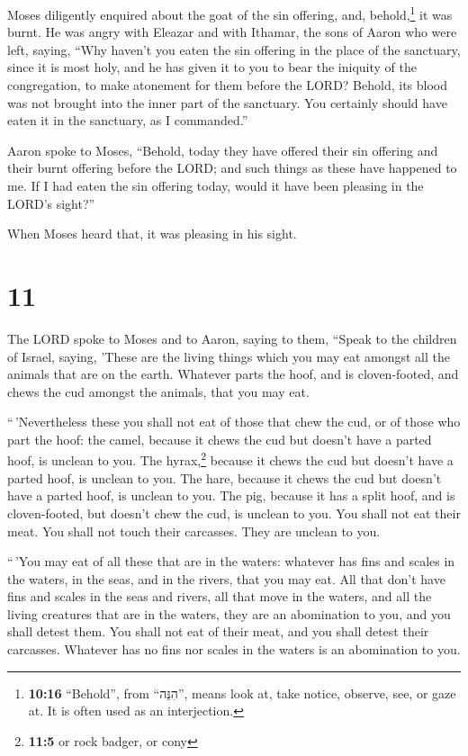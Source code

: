  Moses diligently enquired about the goat of the sin
offering, and, behold,\footnote{\textbf{10:16} ``Behold'', from
  ``הִנֵּה'', means look at, take notice, observe, see, or gaze at. It
  is often used as an interjection.} it was burnt. He was angry with
Eleazar and with Ithamar, the sons of Aaron who were left, saying,
 ``Why haven't you eaten the sin offering in the place of
the sanctuary, since it is most holy, and he has given it to you to bear
the iniquity of the congregation, to make atonement for them before the
LORD?  Behold, its blood was not brought into the inner
part of the sanctuary. You certainly should have eaten it in the
sanctuary, as I commanded.''

 Aaron spoke to Moses, ``Behold, today they have offered
their sin offering and their burnt offering before the LORD; and such
things as these have happened to me. If I had eaten the sin offering
today, would it have been pleasing in the LORD's sight?''

 When Moses heard that, it was pleasing in his sight.

\hypertarget{section-10}{%
\section{11}\label{section-10}}

 The LORD spoke to Moses and to Aaron, saying to them,
 ``Speak to the children of Israel, saying, 'These are the
living things which you may eat amongst all the animals that are on the
earth.  Whatever parts the hoof, and is cloven-footed, and
chews the cud amongst the animals, that you may eat.

 ``\,'Nevertheless these you shall not eat of those that
chew the cud, or of those who part the hoof: the camel, because it chews
the cud but doesn't have a parted hoof, is unclean to you.
 The hyrax,\footnote{\textbf{11:5} or rock badger, or cony}
because it chews the cud but doesn't have a parted hoof, is unclean to
you.  The hare, because it chews the cud but doesn't have
a parted hoof, is unclean to you.  The pig, because it has
a split hoof, and is cloven-footed, but doesn't chew the cud, is unclean
to you.  You shall not eat their meat. You shall not touch
their carcasses. They are unclean to you.

 ``\,'You may eat of all these that are in the waters:
whatever has fins and scales in the waters, in the seas, and in the
rivers, that you may eat.  All that don't have fins and
scales in the seas and rivers, all that move in the waters, and all the
living creatures that are in the waters, they are an abomination to you,
 and you shall detest them. You shall not eat of their
meat, and you shall detest their carcasses.  Whatever has
no fins nor scales in the waters is an abomination to you.

